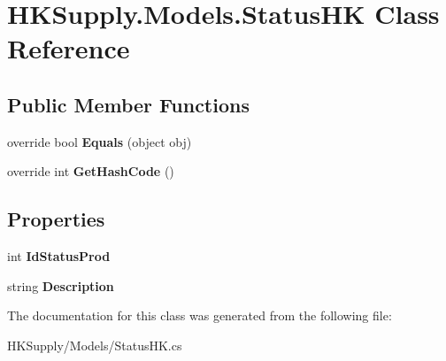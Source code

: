\hypertarget{class_h_k_supply_1_1_models_1_1_status_h_k}{}\section{H\+K\+Supply.\+Models.\+Status\+HK Class Reference}
\label{class_h_k_supply_1_1_models_1_1_status_h_k}
\subsection*{Public Member Functions}
\begin{DoxyCompactItemize}
\item 
\mbox{\label{class_h_k_supply_1_1_models_1_1_status_h_k_a098125c8b3e7dc096497523cde1172cc}} 
override bool {\bfseries Equals} (object obj)
\item 
\mbox{\label{class_h_k_supply_1_1_models_1_1_status_h_k_a95f2b80d0a998ea21821b9c9b0d600e2}} 
override int {\bfseries Get\+Hash\+Code} ()
\end{DoxyCompactItemize}
\subsection*{Properties}
\begin{DoxyCompactItemize}
\item 
\mbox{\label{class_h_k_supply_1_1_models_1_1_status_h_k_acba5b6ab78bcb1e859fe34e164f59dfc}} 
int {\bfseries Id\+Status\+Prod}
\item 
\mbox{\label{class_h_k_supply_1_1_models_1_1_status_h_k_a3e73b5e262d25a623790d4b15c4cf298}} 
string {\bfseries Description}
\end{DoxyCompactItemize}


The documentation for this class was generated from the following file\+:\begin{DoxyCompactItemize}
\item 
H\+K\+Supply/\+Models/Status\+H\+K.\+cs\end{DoxyCompactItemize}
